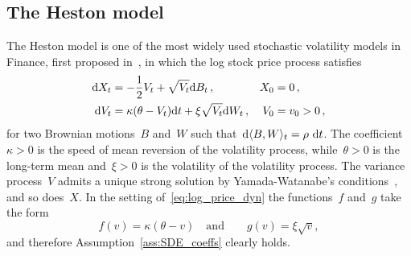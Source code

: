 \subsection{The Heston model}\label{sec:Heston}

The Heston model is one of the most widely used stochastic volatility models in Finance, first proposed in~\cite{Heston1993AOptions}, in which the log stock price process satisfies
\begin{equation}\label{eq:Heston}
\begin{aligned}
    \mathrm{d} X_t &= -\frac12 V_t + \sqrt{V_t}\mathrm{d} B_t\,, & X_0 &= 0\,,\\
    \mathrm{d} V_t &= \kappa (\theta - V_t)\mathrm{d} t + \xi \sqrt{V_t}\mathrm{d} W_t\,, & V_0 &= v_0 > 0\,,
\end{aligned}
\end{equation}
for two Brownian motions~$B$ and~$W$
such that~$\D\langle B, W\rangle_{t} = \rho \ \D t$. 
The coefficient~$\kappa>0$ is the speed of mean reversion of the volatility process, 
while~$\theta>0$ is the long-term mean 
and~$\xi>0$ is the volatility of the volatility process.
The variance process~$V$ admits a unique strong solution by Yamada-Watanabe's conditions~\cite[Proposition 2.13]{Karatzas2012BrownianCalculus}, and so does~$X$.
In the setting of~\eqref{eq:log_price_dyn}
the functions~$f$ and~$g$ take the form
$$
f(v) = \kappa(\theta - v)
\quad\text{and}\qquad
g(v) = \xi\sqrt{v},
$$
and therefore Assumption~\ref{ass:SDE_coeffs} clearly holds.
